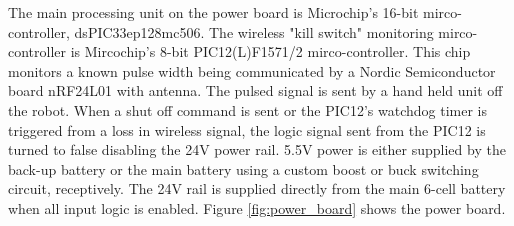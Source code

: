 The main processing unit on the power board is Microchip's 16-bit mirco-controller, dsPIC33ep128mc506. %
The wireless "kill switch" monitoring mirco-controller is Mircochip's 8-bit PIC12(L)F1571/2 mirco-controller.
This chip monitors a known pulse width being communicated by a Nordic Semiconductor board nRF24L01 with antenna.
The pulsed signal is sent by a hand held unit off the robot.
When a shut off command is sent or the PIC12's watchdog timer is triggered from a loss in wireless signal, the logic signal sent from the PIC12 is turned to false disabling the 24V power rail. 
5.5V power is either supplied by the back-up battery or the main battery using a custom boost or buck switching circuit, receptively.
The 24V rail is supplied directly from the main 6-cell battery when all input logic is enabled.
Figure \ref{fig:power_board} shows the power board. 

